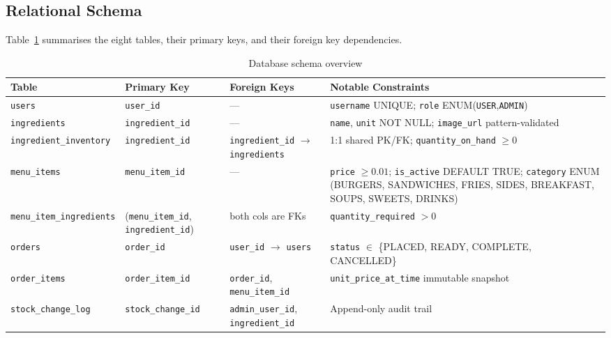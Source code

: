\documentclass[12pt,a4paper]{article}
\begin{document}
\subsection{Relational Schema}

Table~\ref{tab:schema} summarises the eight tables, their primary keys, and
their foreign key dependencies.

\begin{table}[H]
\centering
\caption{Database schema overview}
\label{tab:schema}
\renewcommand{\arraystretch}{1.3}
\begin{tabular}{@{}p{4cm}p{3.2cm}p{3.5cm}p{3.5cm}@{}}
\toprule
\textbf{Table} & \textbf{Primary Key} & \textbf{Foreign Keys} & \textbf{Notable Constraints} \\
\midrule
\texttt{users}
    & \texttt{user\_id}
    & ---
    & \texttt{username} UNIQUE; \texttt{role} ENUM(\texttt{USER},\texttt{ADMIN}) \\

\texttt{ingredients}
    & \texttt{ingredient\_id}
    & ---
    & \texttt{name}, \texttt{unit} NOT NULL; \texttt{image\_url} pattern-validated \\

\texttt{ingredient\_inventory}
    & \texttt{ingredient\_id}
    & \texttt{ingredient\_id} $\to$ \texttt{ingredients}
    & 1:1 shared PK/FK; \texttt{quantity\_on\_hand} $\geq 0$ \\

\texttt{menu\_items}
    & \texttt{menu\_item\_id}
    & ---
    & \texttt{price} $\geq 0.01$; \texttt{is\_active} DEFAULT TRUE;
      \texttt{category} ENUM (BURGERS, SANDWICHES, FRIES, SIDES, BREAKFAST,
      SOUPS, SWEETS, DRINKS) \\

\texttt{menu\_item\_ingredients}
    & (\texttt{menu\_item\_id}, \texttt{ingredient\_id})
    & both cols are FKs
    & \texttt{quantity\_required} $> 0$ \\

\texttt{orders}
    & \texttt{order\_id}
    & \texttt{user\_id} $\to$ \texttt{users}
    & \texttt{status} $\in$ \{PLACED, READY, COMPLETE, CANCELLED\} \\

\texttt{order\_items}
    & \texttt{order\_item\_id}
    & \texttt{order\_id}, \texttt{menu\_item\_id}
    & \texttt{unit\_price\_at\_time} immutable snapshot \\

\texttt{stock\_change\_log}
    & \texttt{stock\_change\_id}
    & \texttt{admin\_user\_id}, \texttt{ingredient\_id}
    & Append-only audit trail \\
\bottomrule
\end{tabular}
\end{table}
\end{document}
